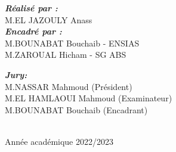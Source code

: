 \begin{titlepage}
\begin{center}
    
    

    \begin{minipage}{0.49\textwidth}
        \vspace{-4mm}
      \begin{flushleft} \large
        \emph{\bfseries Réalisé par :}\\[0.3cm]
        M.EL JAZOULY Anass \\[0.5cm]
        \emph{\bfseries Encadré par :} \\[0.3cm]
        M.BOUNABAT Bouchaib - ENSIAS \\[0.3cm]
        M.ZAROUAL Hicham - SG ABS
      \end{flushleft}
    \end{minipage}
    \begin{minipage}{0.49\textwidth}
      \vspace{-6mm}
      \begin{flushright} \large
        \emph{\bfseries Jury:} \\[0.3cm]
        M.NASSAR Mahmoud (Président)\\[0.3cm]
        M.EL HAMLAOUI Mahmoud (Examinateur)\\[0.3cm]
        M.BOUNABAT Bouchaib (Encadrant)\\
    
      \end{flushright}
    \end{minipage}\\[1cm]
    \vfill
    {\large  Année académique 2022/2023}\\
\end{center}
\end{titlepage}
